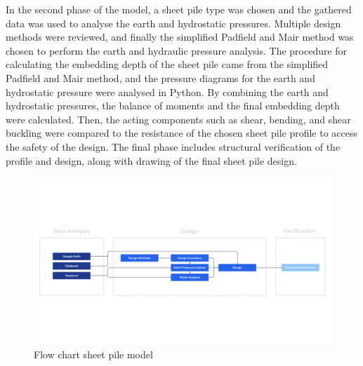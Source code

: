 In the second phase of the model, a sheet pile type was chosen and the gathered data was used to analyse the earth and hydrostatic pressures. Multiple design methods were reviewed, and finally the simplified Padfield and Mair method was chosen to perform the earth and hydraulic pressure analysis. The procedure for calculating the embedding depth of the sheet pile came from the simplified Padfield and Mair method, and the pressure diagrams for the earth and hydrostatic pressure were analysed in Python. By combining the earth and hydrostatic pressures, the balance of moments and the final embedding depth were calculated. Then, the acting components such as shear, bending, and shear buckling were compared to the resistance of the chosen sheet pile profile to access the safety of the design. The final phase includes structural verification of the profile and design, along with drawing of the final sheet pile design.

\begin{landscape}
\begin{figure}[H]
    \centering
    \includegraphics[width=\linewidth]{figures/ch3/FlowChart Structural (4).png}
    \caption{Flow chart sheet pile model}
    \label{fig:flow_chart}
\end{figure}
\end{landscape}